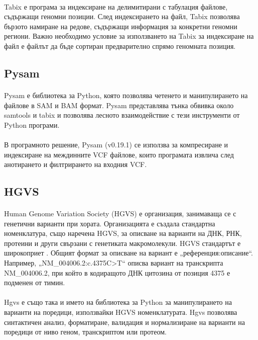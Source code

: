 \documentclass[pdftex,cyrillic,14pt,a4page,twoside,openright]{extreport}
\begin{document}
\paragraph{}
Tabix е 	програма за индексиране на делимитирани с табулация файлове, съдържащи геномни позиции. След индексирането на файл, Tabix позволява бързото намиране на редове, съдържащи информация за конкретни геномни региони. Важно необходимо условие за използването на Tabix за индексиране на файл е файлът да бъде сортиран предварително спрямо геномната позиция.

\subsection{Pysam}\label{sec:pysam}
\paragraph{}
Pysam \cite{pysam} е библиотека за Python, която позволява четенето и манипулирането на файлове в SAM и BAM формат. Pysam представлява тънка обвивка около samtools и tabix и позволява лесното взаимодействие с тези инструменти от Python програми.

\paragraph{}
В програмното решение, Pysam (v0.19.1) се използва за компресиране и индексиране на междинните VCF файлове, които програмата извлича след анотирането и филтрирането на входния VCF.

\subsection{HGVS}\label{sec:hgvs}
\paragraph{}
Human Genome Variation Society (HGVS) е организация, занимаваща се с генетични варианти при хората. Организацията е създала стандартна номенклатура, също наречена HGVS, за описване на варианти на ДНК, РНК, протеини и други свързани с генетиката макромолекули. HGVS стандартът е широкоприет \cite{dunnen2016}. Общият формат за описване на вариант е „референция:описание“. Например, „NM\_004006.2:c.4375C>T“ описва вариант на транскрипта NM\_004006.2, при който в кодиращото ДНК цитозина от позиция 4375 е подменен от тимин.

\paragraph{}
Hgvs \cite{wang2018} е също така и името на библиотека за Python за манипулирането на варианти на поредици, използвайки HGVS номенклатурата. Hgvs позволява синтактичен анализ, форматиране, валидация и нормализиране на варианти на поредици от ниво геном, транскриптом или протеом.
\end{document}

